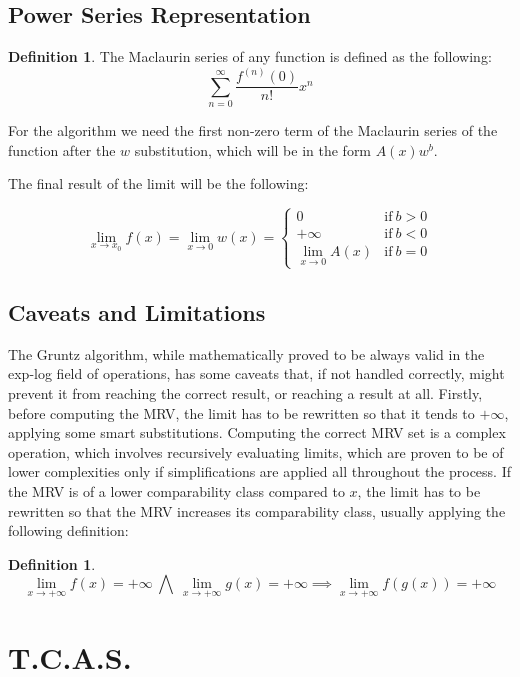 \documentclass{article}
\theoremstyle{plain}
\theoremstyle{definition}
\newtheorem{defn}[thm]{Definition}
\begin{document}
	\subsection{Power Series Representation}
	
	\begin{defn}
		The Maclaurin series of any function is defined as the following:
		\[
		\sum_{n=0}^{\infty}{\frac{f^{(n)}(0)}{n!} x^{n}}
		\]
	\end{defn}
	
	For the algorithm we need the first non-zero term of the Maclaurin series of the function after the \(w\) substitution, which will be in the form \(A(x)w^b\).
	
	The final result of the limit will be the following:
	
	\[
	\lim_{x \to x_{0}}{f(x)} = \lim_{x \to 0}{w(x)} = \begin{cases}
		0 &\text{if} \: b > 0 \\
		+\infty &\text{if} \: b < 0\\
		\lim_{x \to 0}{A(x)} &\text{if} \: b = 0
	\end{cases}
	\]
	
	\subsection{Caveats and Limitations}
	
	The Gruntz algorithm, while mathematically proved to be always valid in the exp-log field of operations, has some caveats that, if not handled correctly, might prevent it from reaching the correct result, or reaching a result at all. Firstly, before computing the MRV, the limit has to be rewritten so that it tends to \(+\infty\), applying some smart substitutions.
	Computing the correct MRV set is a complex operation, which involves recursively evaluating limits, which are proven to be of lower complexities only if simplifications are applied all throughout the process. If the MRV is of a lower comparability class compared to \({x}\), the limit has to be rewritten so that the MRV increases its comparability class, usually applying the following definition:
	
	\begin{defn}
		\[
		\lim_{x \to +\infty}{f(x)}=+\infty \: \bigwedge \: \lim_{x \to +\infty}{g(x)}=+\infty \implies \lim_{x \to +\infty}{f(g(x))}=+\infty
		\]
	\end{defn}
	
	\section{T.C.A.S.}
	
\end{document}
